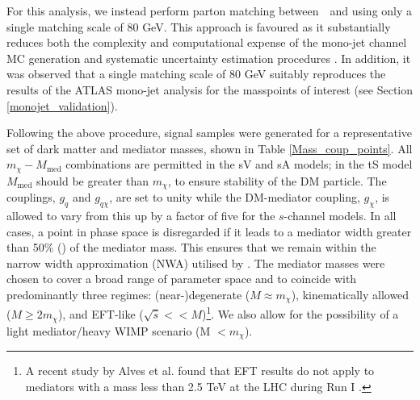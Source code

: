 For this analysis, we instead perform parton matching between \MG$\mbox{ }$and \PYTHIA using only a single matching scale of 80 GeV. This approach is favoured as it substantially reduces both the complexity and computational expense of the mono-jet channel MC generation and systematic uncertainty estimation procedures . In addition, it was observed that a single matching scale of 80 GeV suitably reproduces the results of the ATLAS mono-jet analysis for the masspoints of interest (see Section \ref{monojet_validation}).
\bigskip

Following the above procedure, signal samples were generated for a representative set of dark matter and mediator masses, shown in Table \ref{Mass_coup_points}. All $m_{\chi}-M_{\mathrm{med}}$ combinations are permitted in the sV and sA models; in the tS model $M_{\mathrm{med}}$ should be greater than $m_{\chi}$, to ensure stability of the DM particle. The couplings, $g_{q}$ and $g_{q\chi}$, are set to unity while the DM-mediator coupling, $g_{\chi}$, is allowed to vary from this up by a factor of five for the $s$-channel models. In all cases, a point in phase space is disregarded if it leads to a mediator width greater than 50\% () of the mediator mass. This ensures that we remain within the narrow width approximation (NWA) utilised by \MG. The mediator masses were chosen to cover a broad range of parameter space and to coincide with predominantly three regimes: (near-)degenerate ($M\approx m_{\chi}$), kinematically allowed ($M \geq 2m_{\chi}$), and EFT-like ($\sqrt{\hat{s}} << M$)\footnote{A recent study by Alves et al. found that EFT results do not apply to mediators with a mass less than 2.5 TeV at the LHC during Run I \cite{Alves:2011wf}.}. We also allow for the possibility of a light mediator/heavy WIMP scenario (M $<m_{\chi}$).

